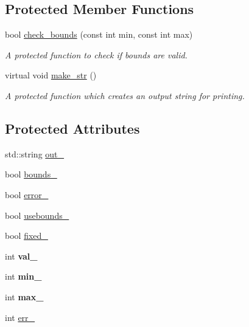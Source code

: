\subsection*{Protected Member Functions}
\begin{DoxyCompactItemize}
\item 
bool \hyperlink{class_integer_parameter_a0d33cf98f71bd2c2e3106989398a271b}{check\-\_\-bounds} (const int min, const int max)
\begin{DoxyCompactList}\small\item\em A protected function to check if bounds are valid. \end{DoxyCompactList}\item 
virtual void \hyperlink{class_integer_parameter_a0432071f33c3d53b730dbe888ff90f46}{make\-\_\-str} ()
\begin{DoxyCompactList}\small\item\em A protected function which creates an output string for printing. \end{DoxyCompactList}\end{DoxyCompactItemize}
\subsection*{Protected Attributes}
\begin{DoxyCompactItemize}
\item 
std\-::string \hyperlink{class_integer_parameter_abf6356e2879d6f09f45a52d65844998f}{out\-\_\-}
\item 
bool \hyperlink{class_integer_parameter_a6f95c4b841a3d669d15c46e787f73153}{bounds\-\_\-}
\item 
bool \hyperlink{class_integer_parameter_a611862af84b9db773cf8690fb0f888fb}{error\-\_\-}
\item 
bool \hyperlink{class_integer_parameter_ab68632ed3d270b082ebfb16de643e3df}{usebounds\-\_\-}
\item 
bool \hyperlink{class_integer_parameter_a7a3f5d9413ccb5fd1814a7db9e77dcfc}{fixed\-\_\-}
\item 
\hypertarget{class_integer_parameter_a2e91e7ac1f8e3881928738e0354bffea}{int {\bfseries val\-\_\-}}\label{class_integer_parameter_a2e91e7ac1f8e3881928738e0354bffea}

\item 
\hypertarget{class_integer_parameter_a7d37150cc66baebfd0a7cb0679dd8705}{int {\bfseries min\-\_\-}}\label{class_integer_parameter_a7d37150cc66baebfd0a7cb0679dd8705}

\item 
\hypertarget{class_integer_parameter_af4d3eab97deb4577e316d210e51ebd7c}{int {\bfseries max\-\_\-}}\label{class_integer_parameter_af4d3eab97deb4577e316d210e51ebd7c}

\item 
int \hyperlink{class_integer_parameter_a713ac37a8c8d820e212881178719ae91}{err\-\_\-}
\end{DoxyCompactItemize}
